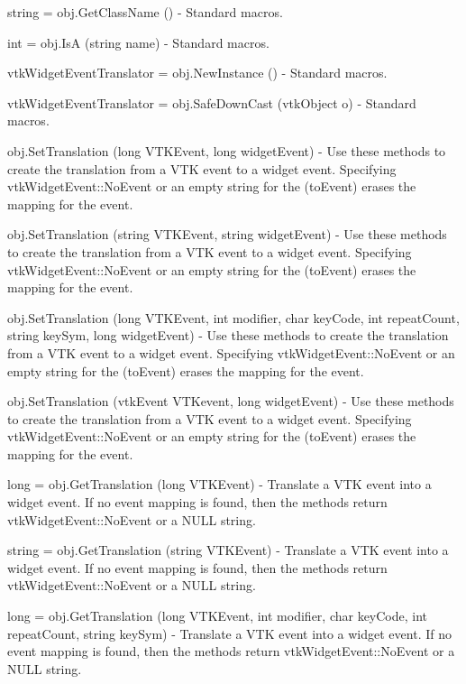 \begin{DoxyItemize}
\item {\ttfamily string = obj.\-Get\-Class\-Name ()} -\/ Standard macros.  
\item {\ttfamily int = obj.\-Is\-A (string name)} -\/ Standard macros.  
\item {\ttfamily vtk\-Widget\-Event\-Translator = obj.\-New\-Instance ()} -\/ Standard macros.  
\item {\ttfamily vtk\-Widget\-Event\-Translator = obj.\-Safe\-Down\-Cast (vtk\-Object o)} -\/ Standard macros.  
\item {\ttfamily obj.\-Set\-Translation (long V\-T\-K\-Event, long widget\-Event)} -\/ Use these methods to create the translation from a V\-T\-K event to a widget event. Specifying vtk\-Widget\-Event\-::\-No\-Event or an empty string for the (to\-Event) erases the mapping for the event.  
\item {\ttfamily obj.\-Set\-Translation (string V\-T\-K\-Event, string widget\-Event)} -\/ Use these methods to create the translation from a V\-T\-K event to a widget event. Specifying vtk\-Widget\-Event\-::\-No\-Event or an empty string for the (to\-Event) erases the mapping for the event.  
\item {\ttfamily obj.\-Set\-Translation (long V\-T\-K\-Event, int modifier, char key\-Code, int repeat\-Count, string key\-Sym, long widget\-Event)} -\/ Use these methods to create the translation from a V\-T\-K event to a widget event. Specifying vtk\-Widget\-Event\-::\-No\-Event or an empty string for the (to\-Event) erases the mapping for the event.  
\item {\ttfamily obj.\-Set\-Translation (vtk\-Event V\-T\-Kevent, long widget\-Event)} -\/ Use these methods to create the translation from a V\-T\-K event to a widget event. Specifying vtk\-Widget\-Event\-::\-No\-Event or an empty string for the (to\-Event) erases the mapping for the event.  
\item {\ttfamily long = obj.\-Get\-Translation (long V\-T\-K\-Event)} -\/ Translate a V\-T\-K event into a widget event. If no event mapping is found, then the methods return vtk\-Widget\-Event\-::\-No\-Event or a N\-U\-L\-L string.  
\item {\ttfamily string = obj.\-Get\-Translation (string V\-T\-K\-Event)} -\/ Translate a V\-T\-K event into a widget event. If no event mapping is found, then the methods return vtk\-Widget\-Event\-::\-No\-Event or a N\-U\-L\-L string.  
\item {\ttfamily long = obj.\-Get\-Translation (long V\-T\-K\-Event, int modifier, char key\-Code, int repeat\-Count, string key\-Sym)} -\/ Translate a V\-T\-K event into a widget event. If no event mapping is found, then the methods return vtk\-Widget\-Event\-::\-No\-Event or a N\-U\-L\-L string.  

\end{DoxyItemize}
